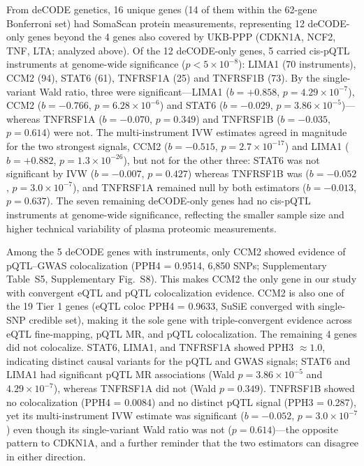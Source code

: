 \documentclass[11pt,a4paper]{article}
\begin{document}
From deCODE genetics, 16 unique genes (14 of them within the 62-gene Bonferroni set) had SomaScan protein measurements,
representing 12 deCODE-only genes beyond the 4 genes also covered by UKB-PPP
(CDKN1A, NCF2, TNF, LTA; analyzed above). Of the 12 deCODE-only genes, 5
carried cis-pQTL instruments at genome-wide significance ($p < 5\times10^{-8}$):
LIMA1 (70 instruments), CCM2 (94), STAT6 (61), TNFRSF1A (25) and TNFRSF1B (73).
By the single-variant Wald ratio, three were significant---LIMA1
($b = +0.858$, $p = 4.29\times10^{-7}$), CCM2 ($b = -0.766$, $p = 6.28\times10^{-6}$)
and STAT6 ($b = -0.029$, $p = 3.86\times10^{-5}$)---whereas TNFRSF1A
($b = -0.070$, $p = 0.349$) and TNFRSF1B ($b = -0.035$, $p = 0.614$) were not.
The multi-instrument IVW estimates agreed in magnitude for the two strongest
signals, CCM2 ($b = -0.515$, $p = 2.7\times10^{-17}$) and LIMA1
($b = +0.882$, $p = 1.3\times10^{-26}$), but not for the other three: STAT6 was
not significant by IVW ($b = -0.007$, $p = 0.427$) whereas TNFRSF1B was
($b = -0.052$, $p = 3.0\times10^{-7}$), and TNFRSF1A remained null by both
estimators ($b = -0.013$, $p = 0.637$). The seven remaining deCODE-only genes had
no cis-pQTL instruments at genome-wide significance, reflecting the
smaller sample size and higher technical variability of plasma proteomic
measurements.

Among the 5 deCODE genes with instruments, only CCM2 showed
evidence of pQTL--GWAS colocalization (PPH4 = 0.9514, 6,850 SNPs;
Supplementary Table~S5, Supplementary Fig.~S8). This makes CCM2 the only gene in our study with
convergent eQTL and pQTL colocalization evidence. CCM2 is also one
of the 19 Tier 1 genes (eQTL coloc PPH4 = 0.9633, SuSiE converged with
single-SNP credible set), making it the sole gene with triple-convergent
evidence across eQTL fine-mapping, pQTL MR, and pQTL colocalization. The
remaining 4 genes did not colocalize. STAT6, LIMA1, and TNFRSF1A showed
PPH3 $\approx 1.0$, indicating distinct causal variants for the pQTL and
GWAS signals; STAT6 and LIMA1 had significant pQTL MR associations (Wald
$p = 3.86\times10^{-5}$ and $4.29\times10^{-7}$), whereas TNFRSF1A did not
(Wald $p = 0.349$). TNFRSF1B showed no colocalization (PPH4 = 0.0084) and no
distinct pQTL signal (PPH3 = 0.287), yet its multi-instrument IVW estimate was
significant ($b = -0.052$, $p = 3.0\times10^{-7}$) even though its single-variant
Wald ratio was not ($p = 0.614$)---the opposite pattern to CDKN1A, and a further
reminder that the two estimators can disagree in either direction.
\end{document}
